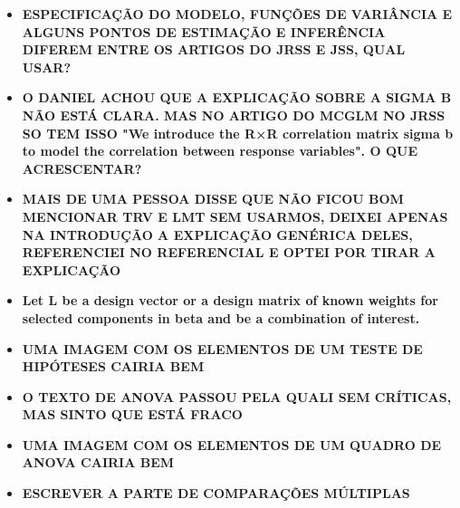 \begin{itemize}
  
  \item \textbf{ESPECIFICAÇÃO DO MODELO, FUNÇÕES DE VARIÂNCIA E ALGUNS PONTOS DE ESTIMAÇÃO E INFERÊNCIA DIFEREM ENTRE OS ARTIGOS DO JRSS E JSS, QUAL USAR?}
  
  \item \textbf{O DANIEL ACHOU QUE A EXPLICAÇÃO SOBRE A SIGMA B NÃO ESTÁ CLARA. MAS NO ARTIGO DO MCGLM NO JRSS SO TEM ISSO "We introduce the R×R correlation matrix sigma b to model the correlation between response variables". O QUE ACRESCENTAR?}
  
  \item \textbf{MAIS DE UMA PESSOA DISSE QUE NÃO FICOU BOM MENCIONAR TRV E LMT SEM USARMOS, DEIXEI APENAS NA INTRODUÇÃO A EXPLICAÇÃO GENÉRICA DELES, REFERENCIEI NO REFERENCIAL E OPTEI POR TIRAR A EXPLICAÇÃO}
  
  \item \textbf{Let L be a design vector or a design matrix of known weights for selected components in beta and be a combination of interest.}

  \item \textbf{UMA IMAGEM COM OS ELEMENTOS DE UM TESTE DE HIPÓTESES CAIRIA BEM}
  
  \item \textbf{O TEXTO DE ANOVA PASSOU PELA QUALI SEM CRÍTICAS, MAS SINTO QUE ESTÁ FRACO}
  
  \item \textbf{UMA IMAGEM COM OS ELEMENTOS DE UM QUADRO DE ANOVA CAIRIA BEM}
  
  \item \textbf{ESCREVER A PARTE DE COMPARAÇÕES MÚLTIPLAS}
    
\end{itemize}
